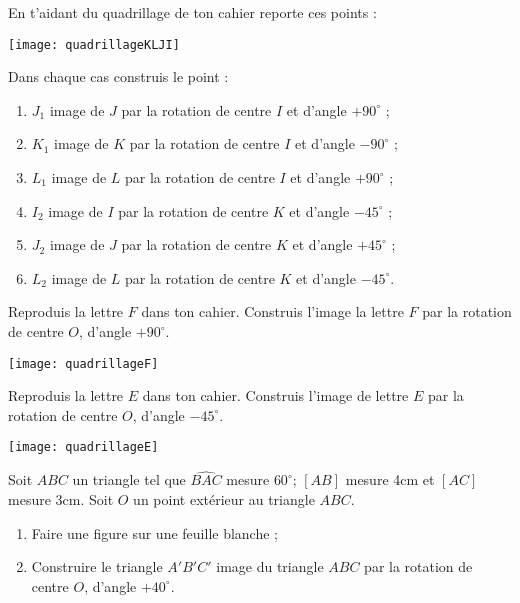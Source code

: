 \vspace{-2.5cm}
\begin{exercice}
En t'aidant du quadrillage de ton cahier reporte ces points :
\begin{center} \texttt{[image: quadrillageKLJI]} \end{center}
Dans chaque cas construis le point :
\begin{enumerate}
 \item $J_1$ image de $J$ par la rotation de centre $I$ et d’angle $+ 90^\circ$ ;
 \item $K_1$ image de $K$ par la rotation de centre $I$ et d’angle $- 90^\circ$ ;
 \item $L_1$ image de $L$ par la rotation de centre $I$ et d’angle $+ 90^\circ$ ;
 \item $I_2$ image de $I$ par la rotation de centre $K$ et d’angle $- 45^\circ$ ;
 \item $J_2$ image de $J$ par la rotation de centre $K$ et d’angle $+ 45^\circ$ ;
 \item $L_2$ image de $L$ par la rotation de centre $K$ et d’angle $- 45^\circ$.
 \end{enumerate}
\end{exercice}


\begin{exercice}
Reproduis la lettre $F$ dans ton cahier. Construis l'image la lettre $F$ par la rotation de centre $O$, d'angle $+ 90^\circ$.
\begin{center} \texttt{[image: quadrillageF]} \end{center}
\end{exercice}


\begin{exercice}
Reproduis la lettre $E$ dans ton cahier. Construis l'image de lettre $E$ par la rotation de centre $O$, d'angle $- 45^\circ$.
\begin{center} \texttt{[image: quadrillageE]} \end{center}
\end{exercice}


\begin{exercice}
Soit $ABC$ un triangle tel que $\widehat{BAC}$ mesure $60^\circ$; $[AB]$ mesure 4cm et $[AC]$ mesure 3cm. Soit $O$ un point extérieur au triangle $ABC$.
\begin{enumerate}
 \item Faire une figure sur une feuille blanche ;
 \item Construire le triangle $A'B'C'$ image du triangle $ABC$ par la rotation de centre $O$, d'angle $+ 40^\circ$.
 \end{enumerate}
\end{exercice}


